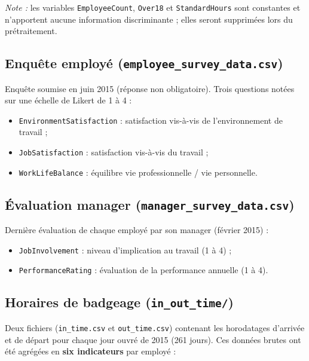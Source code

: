 \textit{Note :} les variables \texttt{EmployeeCount}, \texttt{Over18} et \texttt{StandardHours} sont constantes et n'apportent aucune information discriminante ; elles seront supprimées lors du prétraitement.

\subsection{Enquête employé (\texttt{employee\_survey\_data.csv})}

Enquête soumise en juin 2015 (réponse non obligatoire). Trois questions notées sur une échelle de Likert de 1 à 4 :
\begin{itemize}
    \item \texttt{EnvironmentSatisfaction} : satisfaction vis-à-vis de l'environnement de travail ;
    \item \texttt{JobSatisfaction} : satisfaction vis-à-vis du travail ;
    \item \texttt{WorkLifeBalance} : équilibre vie professionnelle / vie personnelle.
\end{itemize}

\subsection{Évaluation manager (\texttt{manager\_survey\_data.csv})}

Dernière évaluation de chaque employé par son manager (février 2015) :
\begin{itemize}
    \item \texttt{JobInvolvement} : niveau d'implication au travail (1 à 4) ;
    \item \texttt{PerformanceRating} : évaluation de la performance annuelle (1 à 4).
\end{itemize}

\subsection{Horaires de badgeage (\texttt{in\_out\_time/})}

Deux fichiers (\texttt{in\_time.csv} et \texttt{out\_time.csv}) contenant les horodatages d'arrivée et de départ pour chaque jour ouvré de 2015 (261 jours). Ces données brutes ont été agrégées en \textbf{six indicateurs} par employé :

